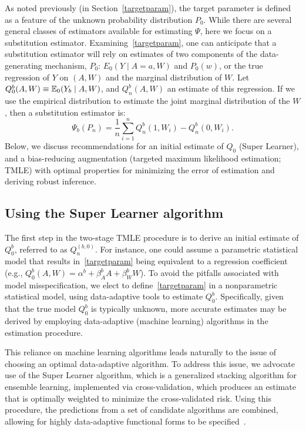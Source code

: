 As noted previously (in Section~\ref{targetparam}), the target parameter is
defined as a feature of the unknown probability distribution $P_{0}$. While
there are several general classes of estimators available for estimating
$\Psi$, here we focus on a substitution estimator. Examining~\ref{targetparam},
one can anticipate that a substitution estimator will rely on estimates of
two components of the data-generating mechanism, $P_0$: $E_0 (Y \mid A=a, W)$
and $P_0(w)$, or the true regression of $Y$ on $(A,W)$ and the marginal
distribution of $W$. Let $Q^{b}_{0}(A, W) \equiv \mathbb{E}_{0}(Y_{b} \mid A, W)$, and
$Q^{b}_{n}(A,W)$ an estimate of this regression. If we use the empirical
distribution to estimate the joint marginal distribution of the $W$, then a
substitution estimator is:
\begin{equation}
\label{subest}
\Psi_b(P_{n}) = \frac{1}{n}\sum_{i = 1}^{n} Q^{b}_{n}(1, W_{i}) - Q^{b}_{n}(0, W_{i}).
\end{equation}
Below, we discuss recommendations for an initial estimate of $Q_0$ (Super
Learner), and a bias-reducing augmentation (targeted maximum likelihood
estimation; TMLE) with optimal properties for minimizing the error of
estimation and deriving robust inference.

\subsection{Using the Super Learner algorithm}\label{superlearner}

The first step in the two-stage TMLE procedure is to derive an initial estimate
of $Q^{b}_{0}$, referred to as $Q^{(b, 0)}_{n}$. For instance, one could assume
a parametric statistical model that results in~\ref{targetparam} being
equivalent to a regression coefficient (e.g., $Q^{b}_{0}(A, W) = \alpha^{b} +
\beta^{b}_{A}A + \beta^{b}_{W}W$). To avoid the pitfalls associated with model
misspecification, we elect to define~\ref{targetparam} in a nonparametric
statistical model, using data-adaptive tools to estimate $Q^{b}_{0}$.
Specifically, given that the true model $Q^{b}_{0}$ is typically unknown, more
accurate estimates may be derived by employing data-adaptive (machine learning)
algorithms in the estimation procedure.

This reliance on machine learning algorithms leads naturally to the issue of
choosing an optimal data-adaptive algorithm. To address this issue, we advocate
use of the Super Learner algorithm, which is a generalized stacking algorithm
for ensemble learning, implemented via cross-validation, which produces an
estimate that is optimally weighted to minimize the cross-validated risk. Using
this procedure, the predictions from a set of candidate algorithms are
combined, allowing for highly data-adaptive functional forms to be
specified~\cite{van2007super}.

